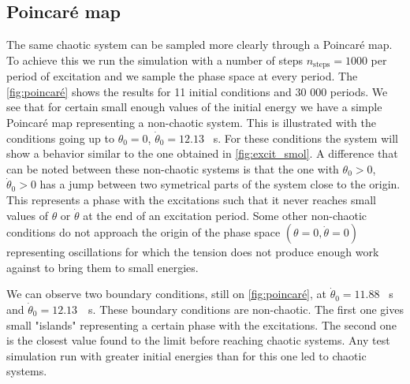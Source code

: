 \subsection{Poincaré map}
The same chaotic system can be sampled more clearly through a Poincaré map. To achieve this we run the simulation with a number of steps $n_\mathrm{steps} = 1000$ per period of excitation and we sample the phase space at every period. The \autoref{fig:poincaré} shows the results for 11 initial conditions and 30 000 periods. We see that for certain small enough values of the initial energy we have a simple Poincaré map representing a non-chaotic system. This is illustrated with the conditions going up to $\theta_0=0$, $\dot\theta_0=12.13$ \si{\per\second}. For these conditions the system will show a behavior similar to the one obtained in \autoref{fig:excit_smol}. A difference that can be noted between these non-chaotic systems is that the one with $\theta_0 > 0$, $\dot\theta_0 > 0$ has a jump between two symetrical parts of the system close to the origin. This represents a phase with the excitations such that it never reaches small values of $\theta$ or $\dot\theta$ at the end of an excitation period. Some other non-chaotic conditions do not approach the origin of the phase space $(\theta = 0, \dot\theta = 0)$ representing oscillations for which the tension does not produce enough work against to bring them to small energies.

We can observe two boundary conditions, still on \autoref{fig:poincaré}, at $\dot\theta_0=11.88$ \si{\per\second} and \mbox{$\dot\theta_0=12.13$ \si{\per\second}}. These boundary conditions are non-chaotic. The first one gives small "islands" representing a certain phase with the excitations. The second one is the closest value found to the limit before reaching chaotic systems. Any test simulation run with greater initial energies than for this one led to chaotic systems.

